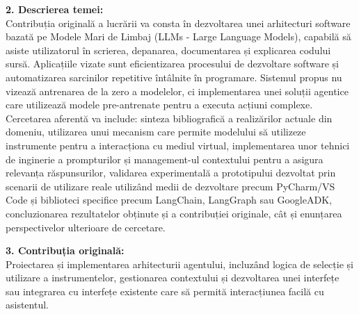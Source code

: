 \documentclass[12pt, a4paper, oneside, romanian, draft]{teza-upb}
\begin{document}
{  \noindent \textbf{2. Descrierea temei:}\\
  Contribuția originală a lucrării va consta în dezvoltarea unei arhitecturi software bazată pe Modele Mari de Limbaj (LLMs - Large Language Models), capabilă să asiste utilizatorul în scrierea, depanarea, documentarea și explicarea codului sursă. Aplicațiile vizate sunt eficientizarea procesului de dezvoltare software și automatizarea sarcinilor repetitive întâlnite în programare. Sistemul propus nu vizează antrenarea de la zero a modelelor, ci implementarea unei soluții agentice care utilizează modele pre-antrenate pentru a executa acțiuni complexe. Cercetarea aferentă va include: sinteza bibliografică a realizărilor actuale din domeniu, utilizarea unui mecanism care permite modelului să utilizeze instrumente pentru a interacționa cu mediul virtual, implementarea unor tehnici de inginerie a prompturilor și management-ul contextului pentru a asigura relevanța răspunsurilor, validarea experimentală a prototipului dezvoltat prin scenarii de utilizare reale utilizând medii de dezvoltare precum PyCharm/VS Code și biblioteci specifice precum LangChain, LangGraph sau GoogleADK, concluzionarea rezultatelor obținute și a contribuției originale, cât și enunțarea perspectivelor ulterioare de cercetare.

  \vspace{0.4cm}

  \noindent \textbf{3. Contribuția originală:}\\
  Proiectarea și implementarea arhitecturii agentului, incluzând logica de selecție și utilizare a instrumentelor, gestionarea contextului și dezvoltarea unei interfețe sau integrarea cu interfețe existente care să permită interacțiunea facilă cu asistentul.

  \vspace{0.4cm}

}
\end{document}
